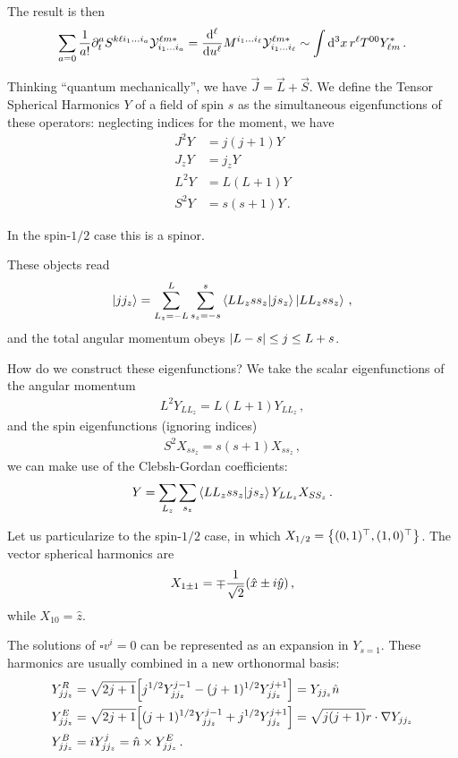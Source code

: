 \documentclass[main.tex]{subfiles}
\begin{document}
The result is then 
%
\begin{align}
\sum _{a=0} \frac{1}{a!} \partial_{t}^{a} S^{k \ell i_1 \dots i_a} \mathcal{Y}^{\ell m *}_{i_1 \dots i_ a} = 
\dv[\ell]{u} M^{i_1 \dots i_\ell} \mathcal{Y}^{\ell m *}_{i_1 \dots i_\ell} \sim
\int \dd[3]{x} r^{\ell} T^{00} Y_{\ell m}^{*}
\,.
\end{align}

Thinking ``quantum mechanically'', we have \(\vec{J} = \vec{L} + \vec{S}\). We define the Tensor Spherical Harmonics \(Y\) of a field of spin \(s\) as the simultaneous eigenfunctions of these operators: neglecting indices for the moment, we have
%
\begin{align}
J^2 Y &= j (j+1) Y \\
J_z Y &= j_z Y \\
L^2 Y &= L (L+1) Y \\
S^2 Y &= s (s+1) Y
\,.
\end{align}

In the spin-\(1/2\) case this is a spinor.

These objects read 
%
\begin{align}
\ket{j j_z} = \sum _{L_z = -L}^{L} \sum _{s_z = -s}^{s} \braket{L L_z s s_z}{j s_z} \ket{L L_z s s_z}
\,,
\end{align}
%
and the total angular momentum obeys \(\abs{L -s} \leq j \leq L + s\). 

How do we construct these eigenfunctions? We take the scalar eigenfunctions of the angular momentum 
%
\begin{align}
L^2 Y_{L L_z} = L (L+1) Y_{L L_z}
\,,
\end{align}
%
and the spin eigenfunctions (ignoring indices)
%
\begin{align}
S^2 X_{s s_z} = s (s+1) X_{s s_z}
\,,
\end{align}
%
we can make use of the Clebsh-Gordan coefficients: 
%
\begin{align}
Y = \sum _{L_z} \sum _{s_z} \braket{L L_z s s_z}{j s_z} Y_{L L_z} X_{S S_z}
\,.
\end{align}

Let us particularize to the spin-\(1/2\) case, in which \(X_{1/2} = \qty{ (0,1)^{\top}, (1, 0)^{\top}}\). 
The vector spherical harmonics are 
%
\begin{align}
X_{1 \pm 1} = \mp \frac{1}{\sqrt{2}} \qty(\hat{x} \pm i \hat{y})
\,,
\end{align}
%
while \(X_{10} = \hat{z}\). 

The solutions of \(\square v^{i} = 0\) can be represented as an expansion in \(Y_{s=1}\). 
These harmonics are usually combined in a new orthonormal basis: 
%
\begin{align}
Y^{R}_{j j_z} &= \sqrt{2 j + 1} \qty[ j^{1/2} Y^{j-1}_{j j_z} - (j+1)^{1/2} Y^{j+1}_{j j_z}] = Y_{j j_z} \hat{n} \\
Y^{E}_{j j_z} &= \sqrt{2j+1} \qty[ (j+1)^{1/2} Y^{j-1}_{j j_z} + j^{1/2} Y^{j+1}_{j j_z}] = \sqrt{j (j+1)} r \cdot \nabla Y_{j j_z} \\
Y^{B}_{j j_z} &= i Y^{j}_{j j_z} = \hat{n} \times Y^{E}_{j j_z}
\,.
\end{align}
\end{document}
